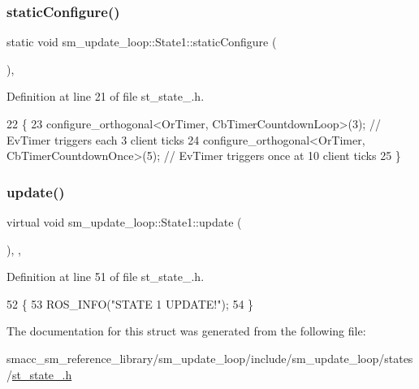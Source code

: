 \subsubsection{\texorpdfstring{static\+Configure()}{staticConfigure()}}
{\footnotesize\ttfamily static void sm\+\_\+update\+\_\+loop\+::\+State1\+::static\+Configure (\begin{DoxyParamCaption}{ }\end{DoxyParamCaption})\hspace{0.3cm}{\ttfamily [inline]}, {\ttfamily [static]}}



Definition at line 21 of file st\+\_\+state\+\_.\+h.


\begin{DoxyCode}
22     \{
23         configure\_orthogonal<OrTimer, CbTimerCountdownLoop>(3); \textcolor{comment}{// EvTimer triggers each 3 client ticks}
24         configure\_orthogonal<OrTimer, CbTimerCountdownOnce>(5); \textcolor{comment}{// EvTimer triggers once at 10 client ticks}
25     \}
\end{DoxyCode}
\mbox{\label{structsm__update__loop_1_1State1_ad31e8291e9ca0d1a4d9dbb76d929c01e}} 
\subsubsection{\texorpdfstring{update()}{update()}}
{\footnotesize\ttfamily virtual void sm\+\_\+update\+\_\+loop\+::\+State1\+::update (\begin{DoxyParamCaption}{ }\end{DoxyParamCaption})\hspace{0.3cm}{\ttfamily [inline]}, {\ttfamily [override]}, {\ttfamily [virtual]}}



Definition at line 51 of file st\+\_\+state\+\_.\+h.


\begin{DoxyCode}
52     \{
53         ROS\_INFO(\textcolor{stringliteral}{"STATE 1 UPDATE!"});
54     \}
\end{DoxyCode}


The documentation for this struct was generated from the following file\+:\begin{DoxyCompactItemize}
\item 
smacc\+\_\+sm\+\_\+reference\+\_\+library/sm\+\_\+update\+\_\+loop/include/sm\+\_\+update\+\_\+loop/states/\hyperlink{sm__update__loop_2include_2sm__update__loop_2states_2st__state__1_8h}{st\+\_\+state\+\_.\+h}\end{DoxyCompactItemize}
